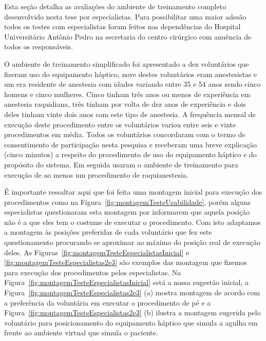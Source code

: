 Esta seção detalha as avaliações do ambiente de treinamento completo desenvolvido nesta tese por especialistas. Para possibilitar uma maior adesão todos os testes com especialistas foram feitos nas dependências do Hospital Universitário Antônio Pedro na secretaria do centro cirúrgico com anuência de todos os responsáveis.

O ambiente de treinamento simplificado foi apresentado a dez voluntários que fizeram uso do equipamento háptico, nove destes voluntários eram anestesistas e um era residente de anestesia com idades variando entre 35 e 54 anos sendo cinco homens e cinco mulheres. Cinco tinham três anos ou menos de experiência em anestesia raquidiana, três tinham por volta de dez anos de experiência e dois deles tinham vinte dois anos com este tipo de anestesia. A frequência mensal de execução deste procedimento entre os voluntários variou entre seis e vinte procedimentos em média. Todos os voluntários concordaram com o termo de consentimento de participação nesta pesquisa e receberam uma breve explicação (cinco minutos) a respeito do procedimento de uso do equipamento háptico e do propósito do sistema. Em seguida usaram o ambiente de treinamento para execução de ao menos um procedimento de raquianestesia. 

É importante ressaltar aqui que foi feita uma montagem inicial para execução dos procedimentos como na Figura~\ref{fig:montagemTesteUsabilidade}, porém alguns especialistas questionaram esta montagem por informarem que aquela posição não é a que eles tem o costume de executar o procedimento. Com isto adaptamos a montagem às posições preferidas de cada voluntário que fez este questionamento procurando se aproximar ao máximo do posição real de execução deles. As Figuras~\ref{fig:montagemTesteEspecialistasInicial} e \ref{fig:montagemTesteEspecialistas2e3} são exemplos das montagem que fizemos para execução dos procedimentos pelos especialistas. Na Figura~\ref{fig:montagemTesteEspecialistasInicial} está a nossa sugestão inicial, a Figura~\ref{fig:montagemTesteEspecialistas2e3} (a) mostra montagem de acordo com a preferência da voluntária em executar o procedimento de pé e a Figura~\ref{fig:montagemTesteEspecialistas2e3} (b) ilustra a montagem sugerida pelo voluntário para posicionamento do equipamento háptico que simula a agulha em frente ao ambiente virtual que simula o paciente.

